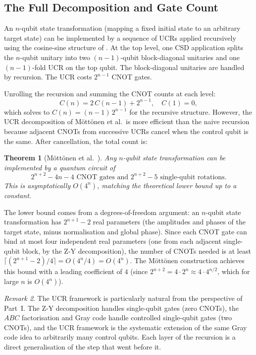 \documentclass[12pt, a4paper, oneside]{report}
\theoremstyle{plain}
\newtheorem{theorem}{Theorem}[chapter]
\theoremstyle{definition}
\theoremstyle{remark}
\newtheorem{remark}[theorem]{Remark}
\begin{document}
\subsection{The Full Decomposition and Gate Count}

An $n$-qubit state transformation (mapping a fixed initial state to an arbitrary target
state) can be implemented by a sequence of UCRs applied recursively using the cosine-sine
structure of . At the top level, one CSD application splits the $n$-qubit
unitary into two $(n-1)$-qubit block-diagonal unitaries and one $(n-1)$-fold UCR on the
top qubit. The block-diagonal unitaries are handled by recursion. The UCR costs $2^{n-1}$
CNOT gates.

Unrolling the recursion and summing the CNOT counts at each level:
\[
	C(n) = 2\,C(n-1) + 2^{n-1}, \quad C(1) = 0,
\]
which solves to $C(n) = (n-1)\,2^{n-1}$ for the recursive structure. However, the UCR
decomposition of Möttönen et al.\ is more efficient than the naive recursion because
adjacent CNOTs from successive UCRs cancel when the control qubit is the same. After
cancellation, the total count is:

\begin{theorem}[Möttönen et al.~\cite{mottonen2004}]
	\label{thm:mottonen}
	Any $n$-qubit state transformation can be implemented by a quantum circuit of
	\[
		2^{n+2} - 4n - 4 \text{ CNOT gates and } 2^{n+2} - 5 \text{ single-qubit rotations.}
	\]
	This is asymptotically $O(4^n)$, matching the theoretical lower bound up to a constant.
\end{theorem}

The lower bound comes from a degrees-of-freedom argument: an $n$-qubit state transformation
has $2^{n+1} - 2$ real parameters (the amplitudes and phases of the target state, minus
normalisation and global phase). Since each CNOT gate can bind at most four independent
real parameters (one from each adjacent single-qubit block, by the Z-Y decomposition), the
number of CNOTs needed is at least $\lceil(2^{n+1} - 2)/4\rceil = O(4^n/4) = O(4^n)$.
The Möttönen construction achieves this bound with a leading coefficient of $4$ (since
$2^{n+2} = 4 \cdot 2^n \approx 4 \cdot 4^{n/2}$, which for large $n$ is $O(4^n)$).

\begin{remark}
	The UCR framework is particularly natural from the perspective of Part~I. The Z-Y
	decomposition handles single-qubit gates (zero CNOTs), the $ABC$ factorisation and Gray
	code handle controlled single-qubit gates (two CNOTs), and the UCR framework is the
	systematic extension of the same Gray code idea to arbitrarily many control qubits. Each
	layer of the recursion is a direct generalisation of the step that went before it.
\end{remark}
\end{document}
